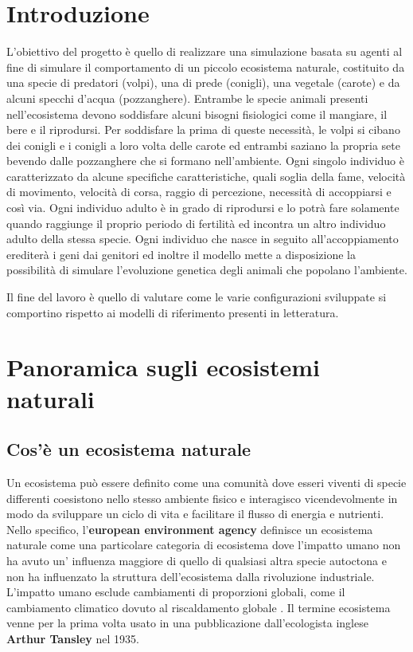 \documentclass[11pt]{article}
\begin{document}
\newpage

\tableofcontents


\newpage

\section{Introduzione}
L'obiettivo del progetto è quello di realizzare una simulazione basata su agenti al fine di simulare il comportamento di un piccolo ecosistema naturale, costituito da una specie di predatori (volpi), una di prede (conigli), una vegetale (carote) e da alcuni specchi d'acqua (pozzanghere). Entrambe le specie animali presenti nell'ecosistema devono soddisfare alcuni bisogni fisiologici come il mangiare, il bere e il riprodursi. Per soddisfare la prima di queste necessità, le volpi si cibano dei conigli e i conigli a loro volta delle carote ed entrambi saziano la propria sete bevendo dalle pozzanghere che si formano nell'ambiente. Ogni singolo individuo è caratterizzato da alcune specifiche caratteristiche, quali soglia della fame, velocità di movimento, velocità di corsa, raggio di percezione, necessità di accoppiarsi e così via. Ogni individuo adulto è in grado di riprodursi e lo potrà fare solamente quando raggiunge il proprio periodo di fertilità ed incontra un altro individuo adulto della stessa specie. Ogni individuo che nasce in seguito all'accoppiamento erediterà i geni dai genitori ed inoltre il modello mette a disposizione la possibilità di simulare l'evoluzione genetica degli animali che popolano l'ambiente. 

Il fine del lavoro è quello di valutare come le varie configurazioni sviluppate si comportino rispetto ai modelli di riferimento presenti in letteratura. 



\section{Panoramica sugli ecosistemi naturali}
\subsection{Cos'è un ecosistema naturale}
Un ecosistema\cite{Vedantu} può essere definito come una comunità dove esseri viventi di specie differenti coesistono nello stesso ambiente fisico e interagisco vicendevolmente in modo da sviluppare un ciclo di vita e facilitare il flusso di energia e nutrienti.
Nello specifico, l'\textbf{european environment agency} definisce un ecosistema naturale come una particolare categoria di ecosistema dove l'impatto umano non ha avuto un' influenza maggiore di quello di qualsiasi altra specie autoctona e non ha influenzato la struttura dell'ecosistema dalla rivoluzione industriale. L'impatto umano esclude cambiamenti di proporzioni globali, come il cambiamento climatico dovuto al riscaldamento globale \cite{EEA}.
Il termine ecosistema venne per la prima volta usato in una pubblicazione dall'ecologista inglese \textbf{Arthur Tansley} nel 1935\cite{WikiEcosystem}.
\end{document}
